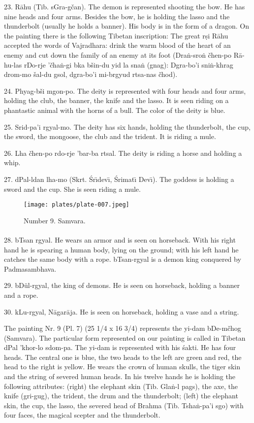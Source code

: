 \documentclass[a4paper, 12pt, oneside]{article}
\begin{document}
23. R\={a}hu (Tib. sGra-gčan). The demon is represented shooting the bow. He has nine heads and four arms. Besides the bow, he is holding the lasso and the thunderbolt (usually he holds a banner). His body is in the form of a dragon. On the painting there is the following Tibetan inscription: The great r\d{s}i R\={a}hu accepted the words of Vajradhara: drink the warm blood of the heart of an enemy and cut down the family of an enemy at its foot (Dra\.{n}-sro\.{n} čhen-po R\={a}-hu-las rDo-rje 'čha\.{n}-gi bka bšin-du yid la sna\.{n} (gnag): Dgra-bo'i sni\.{n}-khrag drom-mo šal-du gsol, dgra-bo'i mi-brgyud rtsa-nas čhod).

24. Phyag-bši mgon-po. The deity is represented with four heads and four arms, holding the club, the banner, the knife and the lasso. It is seen riding on a phantastic animal with the horns of a bull. The color of the deity is blue.

25. Srid-pa'i rgyal-mo. The deity has six hands, holding the thunderbolt, the cup, the sword, the mongoose, the club and the trident. It is riding a mule.

26. Lha čhen-po rdo-rje 'bar-ba rtsal. The deity is riding a horse and holding a whip.

27. dPal-ldan lha-mo (Skrt. \'{S}r\={\i}dev\={\i}, \'{S}rimat\={\i} Dev\={\i}). The goddess is holding a sword and the cup. She is seen riding a mule.

\clearpage
\begin{figure}[H]
\centering
\texttt{[image: plates/plate-007.jpeg]}
\caption*{Number 9. Samvara.}
\end{figure}
\clearpage
\paragraph{}
28. bTsan rgyal. He wears an armor and is seen on horseback. With his right hand he is spearing a human body, lying on the ground; with his left hand he catches the same body with a rope. bTsan-rgyal is a demon king conquered by Padmasambhava.

29. bDül-rgyal, the king of demons. He is seen on horseback, holding a banner and a rope.

30. kLu-rgyal, N\={a}gar\={a}ja. He is seen on horseback, holding a vase and a string.

\bigskip

The painting Nr. 9 (Pl. 7) (25 1/4 x 16 3/4) represents the yi-dam bDe-mčhog (Samvara). The particular form represented on our painting is called in Tibetan dPal 'khor-lo sdom-pa. The yi-dam is represented with his \'{s}akti. He has four heads. The central one is blue, the two heads to the left are green and red, the head to the right is yellow. He wears the crown of human skulls, the tiger skin and the string of severed human heads. In his twelve hands he is holding the following attributes: (right) the elephant skin (Tib. Gla\.{n}-l pags), the axe, the knife (gri-gug), the trident, the drum and the thunderbolt; (left) the elephant skin, the cup, the lasso, the severed head of Brahma (Tib. Tsha\.{n}-pa'i sgo) with four faces, the magical scepter and the thunderbolt.
\end{document}

